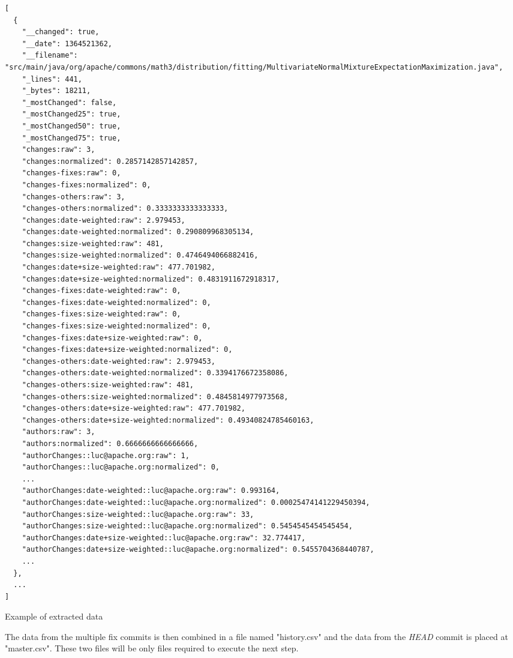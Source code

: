 \begin{lstlisting}
[
  {
    "__changed": true,
    "__date": 1364521362,
    "__filename": "src/main/java/org/apache/commons/math3/distribution/fitting/MultivariateNormalMixtureExpectationMaximization.java",
    "_lines": 441,
    "_bytes": 18211,
    "_mostChanged": false,
    "_mostChanged25": true,
    "_mostChanged50": true,
    "_mostChanged75": true,
    "changes:raw": 3,
    "changes:normalized": 0.2857142857142857,
    "changes-fixes:raw": 0,
    "changes-fixes:normalized": 0,
    "changes-others:raw": 3,
    "changes-others:normalized": 0.3333333333333333,
    "changes:date-weighted:raw": 2.979453,
    "changes:date-weighted:normalized": 0.290809968305134,
    "changes:size-weighted:raw": 481,
    "changes:size-weighted:normalized": 0.4746494066882416,
    "changes:date+size-weighted:raw": 477.701982,
    "changes:date+size-weighted:normalized": 0.4831911672918317,
    "changes-fixes:date-weighted:raw": 0,
    "changes-fixes:date-weighted:normalized": 0,
    "changes-fixes:size-weighted:raw": 0,
    "changes-fixes:size-weighted:normalized": 0,
    "changes-fixes:date+size-weighted:raw": 0,
    "changes-fixes:date+size-weighted:normalized": 0,
    "changes-others:date-weighted:raw": 2.979453,
    "changes-others:date-weighted:normalized": 0.3394176672358086,
    "changes-others:size-weighted:raw": 481,
    "changes-others:size-weighted:normalized": 0.4845814977973568,
    "changes-others:date+size-weighted:raw": 477.701982,
    "changes-others:date+size-weighted:normalized": 0.49340824785460163,
    "authors:raw": 3,
    "authors:normalized": 0.6666666666666666,
    "authorChanges::luc@apache.org:raw": 1,
    "authorChanges::luc@apache.org:normalized": 0,
    ...
    "authorChanges:date-weighted::luc@apache.org:raw": 0.993164,
    "authorChanges:date-weighted::luc@apache.org:normalized": 0.00025474141229450394,
    "authorChanges:size-weighted::luc@apache.org:raw": 33,
    "authorChanges:size-weighted::luc@apache.org:normalized": 0.5454545454545454,
    "authorChanges:date+size-weighted::luc@apache.org:raw": 32.774417,
    "authorChanges:date+size-weighted::luc@apache.org:normalized": 0.5455704368440787,
    ...
  },
  ...
]
\end{lstlisting}
\caption{Example of extracted data}


The data from the multiple fix commits is then combined in a file named "history.csv" and the data from the \emph{HEAD} commit is placed at "master.csv". 
These two files will be only files required to execute the next step.


